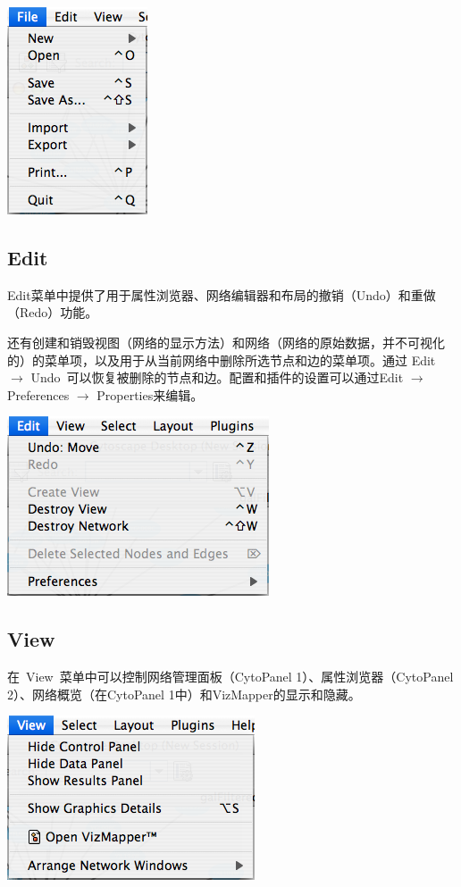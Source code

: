 	\centerline{\includegraphics{images/menu_file_26.png} }

	\subsection{Edit}
	Edit菜单中提供了用于属性浏览器、网络编辑器和布局的撤销（Undo）和重做（Redo）功能。
	
	还有创建和销毁视图（网络的显示方法）和网络（网络的原始数据，并不可视化的）的菜单项，以及用于从当前网络中删除所选节点和边的菜单项。通过 Edit $\rightarrow$ Undo~可以恢复被删除的节点和边。配置和插件的设置可以通过Edit $\rightarrow$ Preferences $\rightarrow$ Properties来编辑。

	\centerline{\includegraphics{images/menu_edit_26.png}}

	\subsection{View}
	在~View~菜单中可以控制网络管理面板（CytoPanel 1）、属性浏览器（CytoPanel 2）、网络概览（在CytoPanel 1中）和VizMapper的显示和隐藏。

	\centerline{\includegraphics{images/menu_view_26.png}}


